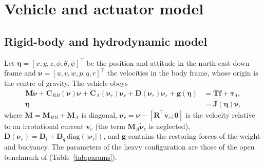 \documentclass[review,12pt]{elsarticle}
\newcommand{\bnu}{\boldsymbol{\nu}}
\newcommand{\beeta}{\boldsymbol{\eta}}
\newcommand{\btau}{\boldsymbol{\tau}}
\begin{document}
\section{Vehicle and actuator model}\label{sec:model}

\subsection{Rigid-body and hydrodynamic model}
Let $\beeta=[x,y,z,\phi,\theta,\psi]^\top$ be the position and attitude in the north-east-down frame
and $\bnu=[u,v,w,p,q,r]^\top$ the velocities in the body frame, whose origin is the centre of gravity.
The vehicle obeys \cite{fossen2011}
\begin{equation}\label{eq:plant}
\begin{aligned}
  \boldsymbol{M}\dot{\bnu} + \boldsymbol{C}_{RB}(\bnu)\bnu + \boldsymbol{C}_{A}(\bnu_r)\bnu_r
  + \boldsymbol{D}(\bnu_r)\bnu_r + \boldsymbol{g}(\beeta) &= \boldsymbol{T}\boldsymbol{f} + \btau_d,\\
  \dot{\beeta} &= \boldsymbol{J}(\beeta)\bnu,
\end{aligned}
\end{equation}
where $\boldsymbol{M}=\boldsymbol{M}_{RB}+\boldsymbol{M}_A$ is diagonal, $\bnu_r=\bnu-[\boldsymbol{R}^\top
\boldsymbol{v}_c;\boldsymbol{0}]$ is the velocity relative to an irrotational current $\boldsymbol{v}_c$
(the term $\boldsymbol{M}_A\dot{\bnu}_c$ is neglected), $\boldsymbol{D}(\bnu_r)=\boldsymbol{D}_l+
\boldsymbol{D}_q\,\mathrm{diag}(|\bnu_r|)$, and $\boldsymbol{g}$ contains the restoring forces of the weight and
buoyancy. The parameters of the heavy configuration are those of the open benchmark of
\cite{vonbenzon2022} (Table~\ref{tab:params}).

\begin{table}[t]
\centering\small
\caption{BlueROV2 Heavy parameters \cite{vonbenzon2022}.}\label{tab:params}
\end{table}
\end{document}
